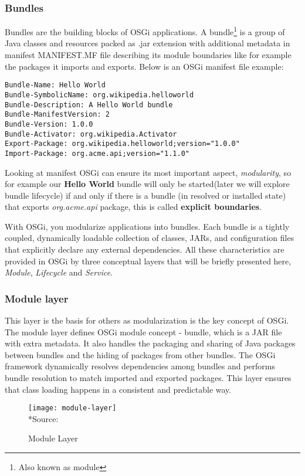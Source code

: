 \subsubsection{Bundles}
Bundles are the building blocks of OSGi applications. A bundle\footnote{Also known as module} is a group of Java classes and resources packed as .jar extension with additional metadata in manifest MANIFEST.MF file describing its module boundaries like for example the packages it imports and exports. Below is an OSGi manifest file example:

\begin{lstlisting}
Bundle-Name: Hello World
Bundle-SymbolicName: org.wikipedia.helloworld
Bundle-Description: A Hello World bundle
Bundle-ManifestVersion: 2
Bundle-Version: 1.0.0
Bundle-Activator: org.wikipedia.Activator
Export-Package: org.wikipedia.helloworld;version="1.0.0"
Import-Package: org.acme.api;version="1.1.0"
\end{lstlisting} 
\FloatBarrier

Looking at manifest OSGi can ensure its most important aspect, \emph{modularity}, so for example our \textbf{Hello World} bundle will only be started(later we will explore bundle lifecycle) if and only if there is a bundle (in resolved or installed state) that exports \emph{org.acme.api} package, this is called \textbf{explicit boundaries}.

With OSGi, you modularize applications into bundles. Each bundle is a tightly coupled, dynamically loadable collection of classes, JARs, and configuration files that explicitly declare any external dependencies. All these characteristics are provided in OSGi by three conceptual layers that will be briefly presented here, \emph{Module}, \emph{Lifecycle} and \emph{Service}.

\subsubsection{Module layer}
This layer is the basis for others as modularization is the key concept of OSGi. The module layer defines OSGi module concept - bundle, which is a JAR file with extra metadata. It also handles the packaging and sharing of Java packages between bundles and the hiding of packages from other bundles. The OSGi framework dynamically resolves dependencies among bundles and performs bundle resolution to match imported and exported packages. This layer ensures that class loading happens in a consistent and predictable way.

\begin{figure}[h]
\label{module layer}
\caption{Module Layer}
\centering
\texttt{[image: module-layer]}
\\*Source: \cite{conceptual layers 2011}
\end{figure}

